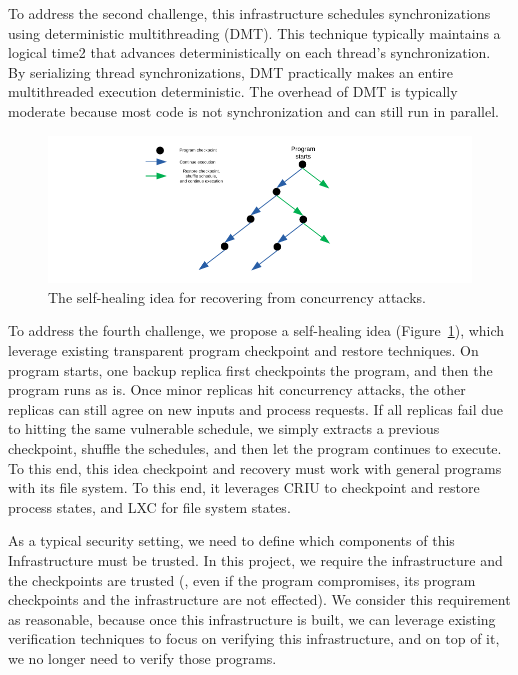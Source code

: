 To address the second challenge, this infrastructure schedules synchronizations 
using deterministic multithreading (DMT). This technique
typically maintains a logical time2 that advances deterministically on each 
thread's synchronization. By serializing thread synchronizations, DMT 
practically makes an entire multithreaded execution deterministic. The overhead
of DMT is typically moderate because most code is not synchronization and can 
still run in parallel.

\begin{figure}[t]
\centering
\includegraphics[width=0.3\columnwidth]{figures/healing}
\vspace{-.05in}
\caption{{The self-healing idea for recovering from concurrency attacks.}} 
\label{fig:healing}
\vspace{-.05in}
\end{figure}

To address the fourth challenge, we propose a self-healing idea 
(Figure~\ref{fig:healing}), which leverage existing transparent program 
checkpoint and restore techniques. On program starts, one backup replica first 
checkpoints the program, and then the program runs as is. Once minor replicas 
hit concurrency attacks, the other replicas can still agree on new inputs and 
process requests. If all replicas fail due to hitting the same vulnerable 
schedule, we simply extracts a previous checkpoint, shuffle the schedules, and 
then let the program continues to execute. To this end, this idea checkpoint 
and recovery must work with general programs with its file system. To this end, 
it leverages CRIU to checkpoint and restore process states, and LXC for file 
system states.

As a typical security setting, we need to define which components of 
this Infrastructure must be trusted. In this project, we require the 
infrastructure and the checkpoints are trusted (\ie, even if the program 
compromises, its program checkpoints and the infrastructure are not effected). 
We consider this requirement as reasonable, because once this infrastructure is 
built, we can leverage existing verification techniques to focus on verifying 
this infrastructure, and on top of it, we no longer need to verify those 
programs.




